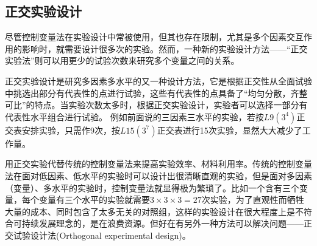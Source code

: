 \subsection{正交实验设计}
尽管控制变量法在实验设计中常被使用，但其也存在限制，尤其是多个因素交互作用的影响时，就需要设计很多次的实验。然而，一种新的实验设计方法——“正交实验法”则可以用更少的试验次数来研究多个变量之间的关系。

正交实验设计是研究多因素多水平的又一种设计方法，它是根据正交性从全面试验中挑选出部分有代表性的点进行试验，这些有代表性的点具备了“均匀分散，齐整可比”的特点\cite{wangxueshen}。当实验次数太多时，根据正交实验设计，实验者可以选择一部分有代表性水平组合进行试验。 例如前面说的三因素三水平的实验，若按$ L9(3^4) $正交表安排实验，只需作9次，按$ L15(3^7) $正交表进行15次实验，显然大大减少了工作量。

用正交实验代替传统的控制变量法来提高实验效率、材料利用率。传统的控制变量法在面对低因素、低水平的实验时可以设计出很清晰直观的实验，但是面对多因素（变量）、多水平的实验时，控制变量法就显得极为繁琐了。比如一个含有三个变量，每个变量有三个水平的实验就需要$ 3\times 3 \times 3=27$次实验，为了直观性而牺牲大量的成本、同时包含了太多无关的对照组，这样的实验设计在很大程度上是不符合可持续发展理念的，是在浪费资源。但好在有另外一种方法可以解决问题——正交试验设计法(Orthogonal experimental design)。

